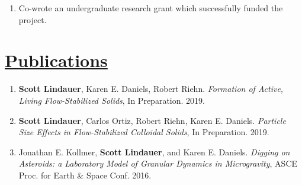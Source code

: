 \documentclass[]{deedy-resume-openfont}
\begin{document}
\begin{minipage}[t]{0.720\textwidth}
\begin{enumerate}[label=\textbullet,leftmargin = !,labelindent = -15pt, itemindent = 0pt, noitemsep, topsep = 0pt]

\item Co-wrote an undergraduate research grant which successfully funded the project.

\end{enumerate}



\section{\underline{Publications}}
\runsubsection{}
\begin{flushleft}
\begin{enumerate}[noitemsep]
\item\textbf{Scott Lindauer}, Karen E. Daniels, Robert Riehn. \textit{Formation of Active, Living Flow-Stabilized Solids}, In Preparation. 2019.

\item\textbf{Scott Lindauer}, Carlos Ortiz, Robert Riehn, Karen E. Daniels. \textit{Particle Size Effects in Flow-Stabilized Colloidal Solids}, In Preparation. 2019.

\item Jonathan E. Kollmer, \textbf{Scott Lindauer}, and Karen E. Daniels. \textit{Digging on Asteroids: a Laboratory Model of Granular Dynamics in Microgravity}, ASCE Proc. for Earth \& Space Conf. 2016.
\end{enumerate}
\end{flushleft}

\end{minipage} 

\pagebreak
\end{document}
